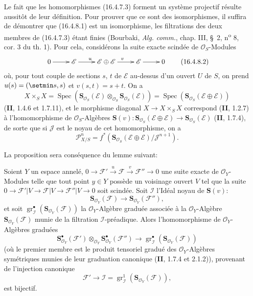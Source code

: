 Le fait que les homomorphismes (16.4.7.3) forment un système projectif résulte
aussitôt de leur définition. Pour prouver que ce sont des isomorphismes, il
suffira de
démontrer que (16.4.8.1) est un isomorphisme, les filtrations des deux membres de
(16.4.7.3) étant finies (Bourbaki, \emph{Alg. comm.}, chap. III, \S~2,
n\textsuperscript{o} 8, cor. 3 du th. 1). Pour cela, considérons la suite exacte
scindée de $\mathcal{O}_S$-Modules
\[
  \xymatrix{
    0 \ar[r] & \mathscr{E} \ar[r]^{u} &
    \mathscr{E}\oplus\mathscr{E} \ar[r]^{v} &
    \mathscr{E} \ar[r] & 0
  }
  \tag{16.4.8.2}
  \label{IV.16.4.8.2}
\]
où, pour tout couple de sections $s$, $t$ de $\mathscr{E}$ au-dessus d'un ouvert
$U$ de $S$, on prend $u(s)=(\setmin s,s)$ et $v(s,t)=s+t$. On a
\[
  X\times_S X=\operatorname{Spec}
  (\mathbf{S}_{\mathcal{O}_S}(\mathscr{E})\otimes_{\mathcal{O}_S}
  \mathbf{S}_{\mathcal{O}_S}(\mathscr{E}))
  =\operatorname{Spec}(\mathbf{S}_{\mathcal{O}_S}
  (\mathscr{E}\oplus\mathscr{E}))
\]
(\textbf{II}, 1.4.6 et 1.7.11), et le morphisme diagonal $X\to X\times_S X$ correspond
(\textbf{II}, 1.2.7) à l'homomorphisme de $\mathcal{O}_S$-Algèbres
$\mathbf{S}(v):\mathbf{S}_{\mathcal{O}_S}(\mathscr{E}\oplus\mathscr{E})
\to\mathbf{S}_{\mathcal{O}_S}(\mathscr{E})$ (\textbf{II}, 1.7.4), de sorte que si
$\mathscr{J}$ est le noyau de cet homomorphisme, on a
\[
  \mathscr{P}_{X/S}^n=f^*(\mathbf{S}_{\mathcal{O}_S}
  (\mathscr{E}\oplus\mathscr{E})/\mathscr{J}^{n+1}).
\]

La proposition sera conséquence du lemme suivant:

\begin{lemma}[16.4.8.3]
\label{IV.16.4.8.3}
Soient $Y$ un espace annelé,
$0\to\mathscr{F}'\xrightarrow{u}\mathscr{F}\xrightarrow{v}\mathscr{F}''\to0$
une suite exacte de $\mathcal{O}_Y$-Modules telle que tout point $y\in Y$
possède un voisinage ouvert $V$ tel que la suite
$0\to\mathscr{F}'|V\to\mathscr{F}|V\to\mathscr{F}''|V\to0$ soit scindée.
Soit $\mathscr{I}$ l'Idéal noyau de
$\mathbf{S}(v)$:
\[
  \mathbf{S}_{\mathcal{O}_Y}(\mathscr{F})\to\mathbf{S}_{\mathcal{O}_Y}(\mathscr{F}''),
\]
et soit
$\operatorname{gr}_{\mathscr{I}}^\bullet
(\mathbf{S}_{\mathcal{O}_Y}(\mathscr{F}))$ la $\mathcal{O}_Y$-Algèbre graduée
associée à la $\mathcal{O}_Y$-Algèbre
$\mathbf{S}_{\mathcal{O}_Y}(\mathscr{F})$ \textup{munie de la filtration
$\mathscr{I}$-préadique}. Alors l'homomorphisme de $\mathcal{O}_Y$-Algèbres
graduées
\[
  \mathbf{S}_{\mathcal{O}_Y}^{\bullet}(\mathscr{F}')
  \otimes_{\mathcal{O}_Y}
  \mathbf{S}_{\mathcal{O}_Y}^{\bullet}(\mathscr{F}'')
  \longrightarrow
  \operatorname{gr}_{\mathscr{I}}^\bullet
  (\mathbf{S}_{\mathcal{O}_Y}(\mathscr{F}))
  \tag{16.4.8.4}
  \label{IV.16.4.8.4}
\]
(où le premier membre est le produit tensoriel gradué des
$\mathcal{O}_Y$-Algèbres symétriques munies de leur graduation canonique
\textup{(\textbf{II}, 1.7.4 et 2.1.2)}), provenant de l'injection canonique
\[
  \mathscr{F}'\longrightarrow\mathscr{I}
  =\operatorname{gr}_{\mathscr{I}}^1
  (\mathbf{S}_{\mathcal{O}_Y}(\mathscr{F})),
\]
est bijectif.
\end{lemma}

